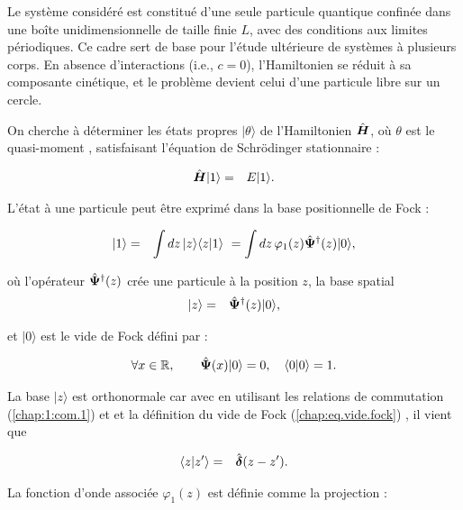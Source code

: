 Le système considéré est constitué d’une seule particule quantique confinée dans une boîte unidimensionnelle de taille finie \(L\), avec des conditions aux limites périodiques. Ce cadre sert de base pour l’étude ultérieure de systèmes à plusieurs corps. En absence d’interactions (i.e., \(c = 0\)), l’Hamiltonien se réduit à sa composante cinétique, et le problème devient celui d’une particule libre sur un cercle.

On cherche à déterminer les états propres \(\vert \theta \rangle\) de l’Hamiltonien \(\hat{\bm{H}}\), où $\theta$ est le quasi-moment , satisfaisant l’équation de Schrödinger stationnaire :

\begin{eqnarray}
	\hat{\bm{H}} \vert 1 \rangle & = & E \vert 1 \rangle.
\end{eqnarray}

L’état à une particule peut être exprimé dans la base positionnelle de Fock :

\begin{eqnarray}
	\vert 1 \rangle & = & \int dz\, \vert z \rangle \langle z \vert 1 \rangle ~= \int dz\, \varphi_1(z) \hat{\bm{\Psi}}^\dag(z) \vert 0 \rangle,
\end{eqnarray}

où l’opérateur \(\hat{\bm{\Psi}}^\dag(z)\) crée une particule à la position \(z\), la base spatial
\begin{eqnarray}
	\vert z \rangle  & = & \hat{\bm{\Psi}}^\dag (z)\vert 0 \rangle ,
\end{eqnarray}

et \(\vert 0 \rangle\) est le vide de Fock défini par :

\begin{eqnarray}
	\forall x \in \mathbb{R}, \qquad \hat{\bm{\Psi}}(x) \vert 0 \rangle = 0 ,\quad  \langle 0\vert 0 \rangle = 1. \label{chap:eq.vide.fock}
\end{eqnarray}

La base $\vert z \rangle$ est orthonormale car avec en utilisant les relations de commutation (\ref{chap:1:com.1}) et et la définition du vide de Fock (\ref{chap:eq.vide.fock}) , il vient que 

\begin{eqnarray}
	\langle z\vert z' \rangle  & = & \hat{\bm{\delta}}(z -z').
\end{eqnarray}



La fonction d’onde associée \(\varphi_1(z)\) est définie comme la projection :

